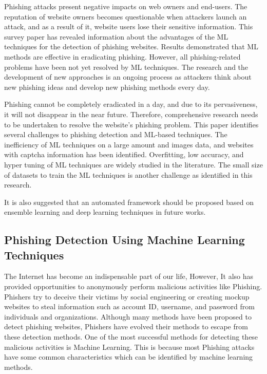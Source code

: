 Phishing attacks present negative impacts on web owners and end-users. The reputation of website owners becomes questionable when attackers launch an attack, and as a result of it, website users lose their sensitive information. This survey paper has revealed information about the advantages of the ML techniques for the detection of phishing websites. Results demonstrated that ML methods are effective in eradicating phishing. However, all phishing-related problems have been not yet resolved by ML techniques. The research and the development of new approaches is an ongoing process as attackers think about new phishing ideas and develop new phishing methods every day.

Phishing cannot be completely eradicated in a day, and due to its pervasiveness, it will not disappear in the near future. Therefore, comprehensive research needs to be undertaken to resolve the website's phishing problem. This paper identifies several challenges to phishing detection and ML-based techniques. The inefficiency of ML techniques on a large amount and images data, and websites with captcha information has been identified. Overfitting, low accuracy, and hyper tuning of ML techniques are widely studied in the literature. The small size of datasets to train the ML techniques is another challenge as identified in this research.

It is also suggested that an automated framework should be proposed based on ensemble learning and deep learning techniques in future works.

\subsection{Phishing Detection Using Machine Learning
Techniques}

The Internet has become an indispensable part of our life, However, It also has provided opportunities to anonymously perform malicious activities like Phishing. Phishers try to deceive their victims by social engineering or creating mockup websites to steal information such as account ID, username, and password from individuals and organizations. Although many methods have been proposed to detect phishing websites, Phishers have evolved their methods to escape from these detection methods. One of the most successful methods for detecting these malicious activities is Machine Learning. This is because most Phishing attacks have some common characteristics which can be identified by machine learning methods.

